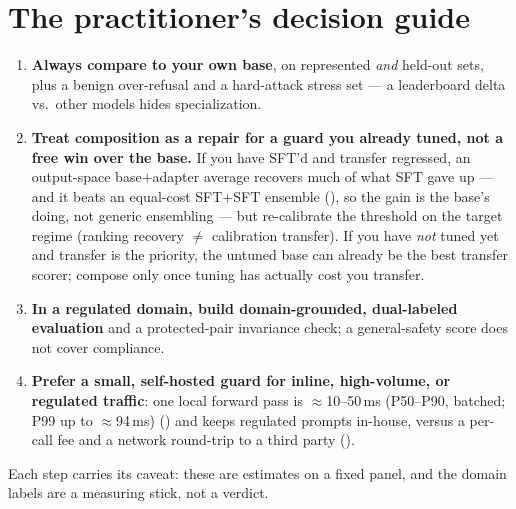 \documentclass[11pt]{article}
\begin{document}
\section{The practitioner's decision guide}
\label{sec:practitioner}
\begin{enumerate}[leftmargin=1.6em,itemsep=1pt]
  \item \textbf{Always compare to your own base}, on represented \emph{and} held-out sets, plus a
  benign over-refusal and a hard-attack stress set --- a leaderboard delta vs.\ other models hides
  specialization.
  \item \textbf{Treat composition as a repair for a guard you already tuned, not a free win over the
  base.} If you have SFT'd and transfer regressed, an output-space base$+$adapter average recovers much of
  what SFT gave up --- and it beats an equal-cost SFT$+$SFT ensemble (), so the gain is the
  base's doing, not generic ensembling --- but re-calibrate the threshold on the target regime (ranking
  recovery $\neq$ calibration transfer). If you have \emph{not} tuned yet and transfer is the priority, the
  untuned base can already be the best transfer scorer; compose only once tuning has actually cost you
  transfer.
  \item \textbf{In a regulated domain, build domain-grounded, dual-labeled evaluation} and a
  protected-pair invariance check; a general-safety score does not cover compliance.
  \item \textbf{Prefer a small, self-hosted guard for inline, high-volume, or regulated traffic}: one
  local forward pass is $\approx$10--50\,ms (P50--P90, batched; P99 up to $\approx$94\,ms) () and keeps regulated prompts in-house,
  versus a per-call fee and a network round-trip to a third party ().
\end{enumerate}
Each step carries its caveat: these are estimates on a fixed panel, and the domain labels are a
measuring stick, not a verdict.
\end{document}
